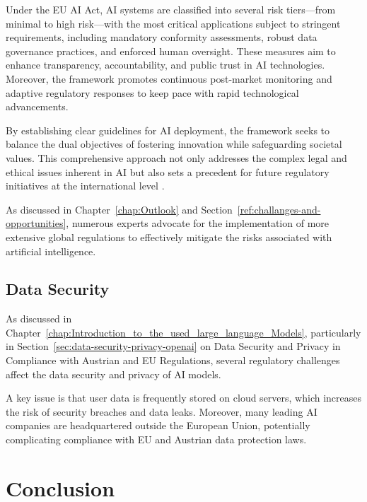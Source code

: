 Under the EU AI Act, AI systems are classified into several risk tiers—from minimal to high risk—with the most critical applications subject to stringent requirements, including mandatory conformity assessments, robust data governance practices, and enforced human oversight. These measures aim to enhance transparency, accountability, and public trust in AI technologies. Moreover, the framework promotes continuous post-market monitoring and adaptive regulatory responses to keep pace with rapid technological advancements.

By establishing clear guidelines for AI deployment, the framework seeks to balance the dual objectives of fostering innovation while safeguarding societal values. This comprehensive approach not only addresses the complex legal and ethical issues inherent in AI but also sets a precedent for future regulatory initiatives at the international level \cite{EURegFrameworkAI}.

As discussed in Chapter~\ref{chap:Outlook} and Section~\ref{ref:challanges-and-opportunities}, numerous experts advocate for the implementation of more extensive global regulations to effectively mitigate the risks associated with artificial intelligence.

\subsection{Data Security}

As discussed in Chapter~\ref{chap:Introduction_to_the_used_large_language_Models}, particularly in Section~\ref{sec:data-security-privacy-openai} on Data Security and Privacy in Compliance with Austrian and EU Regulations, several regulatory challenges affect the data security and privacy of AI models.

A key issue is that user data is frequently stored on cloud servers, which increases the risk of security breaches and data leaks. Moreover, many leading AI companies are headquartered outside the European Union, potentially complicating compliance with EU and Austrian data protection laws.

\section{Conclusion}

